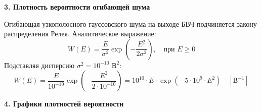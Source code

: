 \vspace{1em}
\textbf{3. Плотность вероятности огибающей шума}

Огибающая узкополосного гауссовского шума на выходе БВЧ подчиняется закону распределения Релея. Аналитическое выражение:
\begin{equation*}
    W(E) = \frac{E}{\sigma^2} \exp\left(-\frac{E^2}{2\sigma^2}\right), \quad \text{при } E \ge 0
\end{equation*}
Подставляя дисперсию $\sigma^2 = 10^{-10} \text{ В}^2$:
\begin{equation*}
    W(E) = \frac{E}{10^{-10}} \exp\left(-\frac{E^2}{2 \cdot 10^{-10}}\right) = 10^{10} \cdot E \cdot \exp\left(-5 \cdot 10^9 \cdot E^2\right) \quad [\text{В}^{-1}]
\end{equation*}

\vspace{1em}
\textbf{4. Графики плотностей вероятности}

